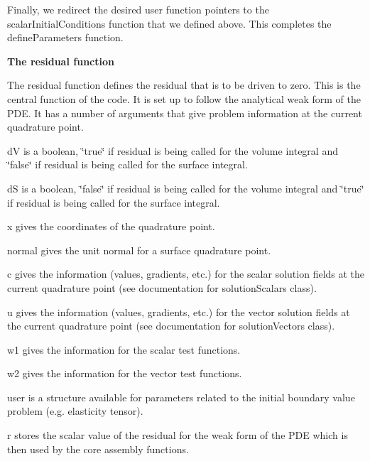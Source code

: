 \begin{DoxyCodeInclude}

\end{DoxyCodeInclude}


Finally, we redirect the desired user function pointers to the {\ttfamily scalar\-Initial\-Conditions} function that we defined above. This completes the {\ttfamily define\-Parameters} function.


\begin{DoxyCodeInclude}

\end{DoxyCodeInclude}


{\bfseries  The {\ttfamily residual} function }

The residual function defines the residual that is to be driven to zero. This is the central function of the code. It is set up to follow the analytical weak form of the P\-D\-E. It has a number of arguments that give problem information at the current quadrature point.


\begin{DoxyCodeInclude}

\end{DoxyCodeInclude}


{\ttfamily d\-V} is a boolean, \char`\"{}true\char`\"{} if {\ttfamily residual} is being called for the volume integral and \char`\"{}false\char`\"{} if {\ttfamily residual} is being called for the surface integral.\par
{\ttfamily d\-S} is a boolean, \char`\"{}false\char`\"{} if {\ttfamily residual} is being called for the volume integral and \char`\"{}true\char`\"{} if {\ttfamily residual} is being called for the surface integral.\par
{\ttfamily x} gives the coordinates of the quadrature point.\par
{\ttfamily normal} gives the unit normal for a surface quadrature point.\par
{\ttfamily c} gives the information (values, gradients, etc.) for the scalar solution fields at the current quadrature point (see documentation for solution\-Scalars class).\par
{\ttfamily u} gives the information (values, gradients, etc.) for the vector solution fields at the current quadrature point (see documentation for solution\-Vectors class).\par
{\ttfamily w1} gives the information for the scalar test functions.\par
{\ttfamily w2} gives the information for the vector test functions.\par
{\ttfamily user} is a structure available for parameters related to the initial boundary value problem (e.\-g. elasticity tensor).\par
{\ttfamily r} stores the scalar value of the residual for the weak form of the P\-D\-E which is then used by the core assembly functions.

